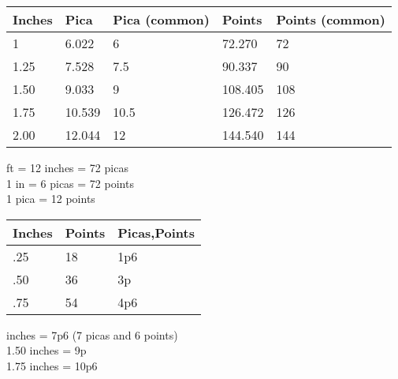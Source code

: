 \documentclass[12pt, letterpaper, oneside]{article}
\begin{document}
\sffamily

\begin{center}
\begin{tabular}{|l|l|l|l|l|}
\hline
\textbf{Inches} & \textbf{Pica} & \textbf{Pica (common)} & \textbf{Points} & \textbf{Points (common)} \tabularnewline \hline
1 & 6.022 & 6 & 72.270 & 72 \tabularnewline \hline
\rowcolor[rgb]{0.85,0.85,0.85} 1.25 & 7.528 & 7.5 & 90.337 & 90 \tabularnewline \hline
1.50 & 9.033 & 9 & 108.405 & 108 \tabularnewline \hline
\rowcolor[rgb]{0.85,0.85,0.85} 1.75 & 10.539 & 10.5 & 126.472 & 126 \tabularnewline \hline
2.00 & 12.044 & 12 & 144.540 & 144 \tabularnewline \hline
\end{tabular}
\end{center}

 ft = 12 inches = 72 picas\\
1 in = 6 picas = 72 points\\
1 pica = 12 points

\begin{center}
\begin{tabular}{|l|l|l|}
\hline
\textbf{Inches} & \textbf{Points} & \textbf{Picas,Points} \tabularnewline \hline 
.25 & 18 & 1p6 \tabularnewline \hline  
\rowcolor[rgb]{0.85,0.85,0.85} .50 & 36 & 3p \tabularnewline \hline
.75 & 54 & 4p6 \tabularnewline \hline
\end{tabular}
\end{center}

 inches = 7p6 (7 picas and 6 points)\\
1.50 inches = 9p\\
1.75 inches = 10p6
\end{document}
